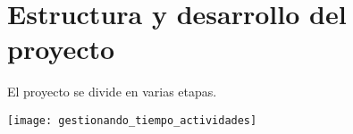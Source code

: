 \chapter{Estructura y desarrollo del proyecto}
\graphicspath{{imagenes/estructura_y_desarrollo/}}
El proyecto se divide en varias etapas.

\texttt{[image: gestionando\_tiempo\_actividades]}